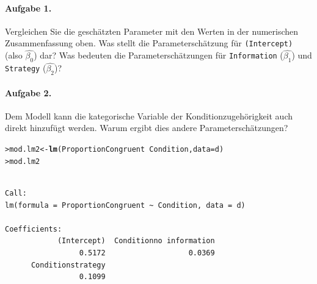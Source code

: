\documentclass[oneside, 10pt]{book}\usepackage[]{graphicx}\usepackage[]{xcolor}
\makeatletter
\newcommand{\hlopt}[1]{\textcolor[rgb]{0,0,0}{#1}}%
\newcommand{\hlstd}[1]{\textcolor[rgb]{0.345,0.345,0.345}{#1}}%
\newcommand{\hlkwb}[1]{\textcolor[rgb]{0.69,0.353,0.396}{#1}}%
\newcommand{\hlkwc}[1]{\textcolor[rgb]{0.333,0.667,0.333}{#1}}%
\newcommand{\hlkwd}[1]{\textcolor[rgb]{0.737,0.353,0.396}{\textbf{#1}}}%
\newenvironment{kframe}{%
 \def\at@end@of@kframe{}%
 \ifinner\ifhmode%
  \def\at@end@of@kframe{\end{minipage}}%
  \begin{minipage}{\columnwidth}%
 \fi\fi%
 \def\FrameCommand##1{\hskip\@totalleftmargin \hskip-\fboxsep
 \colorbox{shadecolor}{##1}\hskip-\fboxsep
     \hskip-\linewidth \hskip-\@totalleftmargin \hskip\columnwidth}%
 \MakeFramed {\advance\hsize-\width
   \@totalleftmargin\z@ \linewidth\hsize
   \@setminipage}}%
 {\par\unskip\endMakeFramed%
 \at@end@of@kframe}
\newenvironment{knitrout}{}{} %
\makeatother
\begin{document}
\paragraph{Aufgabe 1.} Vergleichen Sie die geschätzten Parameter
mit den Werten in der numerischen Zusammenfassung oben. Was stellt
die Parameterschätzung für \texttt{(Intercept)} (also $\widehat{\beta_0}$)
dar? Was bedeuten die Parameterschätzungen für \texttt{Information} ($\widehat{\beta_1}$)
und \texttt{Strategy} ($\widehat{\beta_2}$)?

\paragraph{Aufgabe 2.} Dem Modell kann die kategorische Variable der Konditionzugehörigkeit
auch direkt hinzufügt werden. Warum ergibt dies andere Parameterschätzungen?
\begin{knitrout}
\color{fgcolor}\begin{kframe}
\begin{alltt}
\hlstd{> }\hlstd{mod.lm2} \hlkwb{<-} \hlkwd{lm}\hlstd{(ProportionCongruent} \hlopt{~} \hlstd{Condition,} \hlkwc{data} \hlstd{= d)}
\hlstd{> }\hlstd{mod.lm2}
\end{alltt}
\begin{verbatim}

Call:
lm(formula = ProportionCongruent ~ Condition, data = d)

Coefficients:
            (Intercept)  Conditionno information  
                 0.5172                   0.0369  
      Conditionstrategy  
                 0.1099  
\end{verbatim}
\end{kframe}
\end{knitrout}
\end{document}
